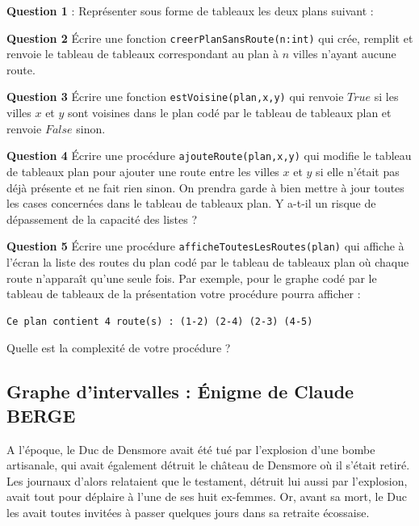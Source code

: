 \medskip
\textbf{Question 1} : Représenter sous forme de tableaux les deux plans suivant :
\begin{center}
\end{center}


\textbf{Question 2} \'Ecrire une fonction \texttt{creerPlanSansRoute(n:int)} qui crée, remplit et renvoie le tableau de tableaux correspondant au plan à $n$ villes n'ayant aucune route.


\textbf{Question 3} \'Ecrire une fonction \texttt{estVoisine(plan,x,y)} qui renvoie $True$ si les villes $x$ et $y$ sont voisines dans le plan codé
par le tableau de tableaux plan et renvoie $False$ sinon.


\textbf{Question 4} \'Ecrire une procédure \texttt{ajouteRoute(plan,x,y)} qui modifie le tableau de tableaux plan pour ajouter une route 
entre les villes $x$ et $y$ si elle n'était pas déjà présente et ne fait rien sinon. On prendra garde à bien mettre à jour
toutes les cases concernées dans le tableau de tableaux plan. Y a-t-il un risque de dépassement de la capacité des listes ?


\textbf{Question 5} \'Ecrire une procédure \texttt{afficheToutesLesRoutes(plan)} qui affiche à l'écran la liste des routes du plan codé par le tableau de tableaux plan
où chaque route n'apparaît qu'une seule fois. Par exemple, pour le graphe codé par le tableau de tableaux de la présentation votre procédure pourra afficher :
\begin{lstlisting}
Ce plan contient 4 route(s) : (1-2) (2-4) (2-3) (4-5)
\end{lstlisting}
Quelle est la complexité de votre procédure ?

\subsection{Graphe d'intervalles : Énigme de Claude BERGE}
A l'époque, le Duc de Densmore avait été tué par l'explosion d'une bombe artisanale, qui avait également détruit le château de Densmore
où il s'était retiré. Les journaux d'alors relataient que le testament, détruit lui aussi par l'explosion, avait tout pour
déplaire à l'une de ses huit ex-femmes. Or, avant sa mort, le Duc les avait toutes invitées à passer quelques jours dans sa retraite écossaise.

